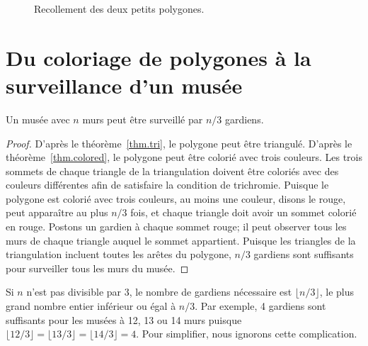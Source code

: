 \begin{figure}[htbp]
\centering
{}
\caption{Recollement des deux petits polygones.}
\label{f.museum.three-5}
\end{figure}



\section{Du coloriage de polygones à la surveillance d'un musée}\label{s.museum-guard}

\begin{theorem}\label{thm.guarded} Un musée avec $n$ murs peut être surveillé par $n/3$ gardiens.
\end{theorem}
\begin{proof}
D'après le théorème~\ref{thm.tri},  le polygone peut être triangulé. D'après le théorème~\ref{thm.colored},  le polygone peut être colorié avec trois couleurs. Les trois sommets de chaque triangle de la triangulation doivent être coloriés avec des couleurs différentes afin de satisfaire la condition de trichromie. Puisque le polygone est colorié avec trois couleurs, au moins une couleur, disons le rouge, peut apparaître au plus $n/3$ fois, et chaque triangle doit avoir un sommet colorié en rouge. Postons un gardien à chaque sommet rouge; il peut observer tous les murs de chaque triangle auquel le sommet appartient. Puisque les triangles de la triangulation incluent toutes les arêtes du polygone, $n/3$ gardiens sont suffisants pour surveiller tous les murs du musée.
\end{proof}
Si $n$ n'est pas divisible par $3$, le nombre de gardiens nécessaire est $\lfloor n/3\rfloor$, le plus grand nombre entier inférieur ou égal à $n/3$. Par exemple, 4 gardiens sont suffisants pour les musées à 12, 13 ou 14 murs puisque $\lfloor 12/3\rfloor =\lfloor 13/3\rfloor=\lfloor 14/3\rfloor=4$. Pour simplifier, nous ignorons cette complication.
 
